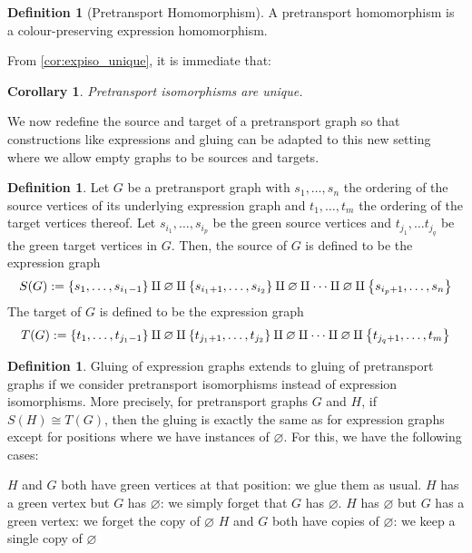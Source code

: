 \documentclass{amsart}
\newcommand{\curly}[1]{\left\{ #1 \right\}}
\newcommand{\set}[2][]{\ifthenelse{\equal{#1}{}}
                                  {\curly{#2}}
                                  {\curly{#1\ \textbf{:}\ #2}}}
\newcommand{\li}[1][]{\ifthenelse{\equal{#1}{}}{\item}{\item \label{#1}}}
\newenvironment{enmrt}{
  \enumerate[(i)]
  \setlength{\itemsep}{0pt}
}{
  \endenumerate
}
\numberwithin{thm}{section}
\newtheorem{cor}[thm]{Corollary}
\theoremstyle{definition}
\newtheorem{defn}[thm]{Definition}
\newtheorem{rmk}[thm]{Remark}
\begin{document}
\begin{defn}[Pretransport Homomorphism]
A pretransport homomorphism is a colour-preserving expression homomorphism.
\end{defn}


From \ref{cor:expiso_unique}, it is immediate that:

\begin{cor}
Pretransport isomorphisms are unique.
\end{cor}

We now redefine the source and target of a pretransport graph so that
constructions like expressions and gluing can be adapted to this new setting
where we allow empty graphs to be sources and targets.

\begin{defn}
Let $G$ be a pretransport graph with $s_1, \dots, s_n$ the ordering of the
source vertices of its underlying expression graph and $t_1, \dots, t_m$ the
ordering of the target vertices thereof. Let $s_{i_1}, \dots, s_{i_p}$ be the
green source vertices and $t_{j_1}, \dots t_{j_q}$ be the green target vertices
in $G$. Then, the source of $G$ is defined to be the expression graph
\[
  S(G) := \set{s_1, \dots, s_{i_1 - 1}}
       \amalg \varnothing
       \amalg \set{s_{i_1 + 1}, \dots, s_{i_2}}
       \amalg \varnothing
       \amalg \cdots
       \amalg \varnothing
       \amalg \set{s_{i_p + 1}, \dots, s_{n}}
\]
The target of $G$ is defined to be the expression graph
\[
  T(G) := \set{t_{1}, \dots, t_{j_1 - 1}}
       \amalg \varnothing
       \amalg \set{t_{j_1 + 1}, \dots, t_{j_2}}
       \amalg \varnothing
       \amalg \cdots
       \amalg \varnothing
       \amalg \set{t_{j_q + 1}, \dots, t_{m}}
\]
\end{defn}

\begin{defn}
Gluing of expression graphs extends to gluing of pretransport graphs if we
consider pretransport isomorphisms instead of expression isomorphisms. More
precisely, for pretransport graphs $G$ and $H$, if $S(H) \cong T(G)$, then the
gluing is exactly the same as for expression graphs except for positions where
we have instances of $\varnothing$. For this, we have the following cases:
\begin{enmrt}
\li $H$ and $G$ both have green vertices at that position: we glue them
as usual.
\li $H$ has a green vertex but $G$ has $\varnothing$: we simply forget
that $G$ has $\varnothing$.
\li $H$ has $\varnothing$ but $G$ has a green vertex: we forget the copy
of $\varnothing$
\li $H$ and $G$ both have copies of $\varnothing$: we keep a single copy
of $\varnothing$
\end{enmrt}
\end{defn}
\end{document}
